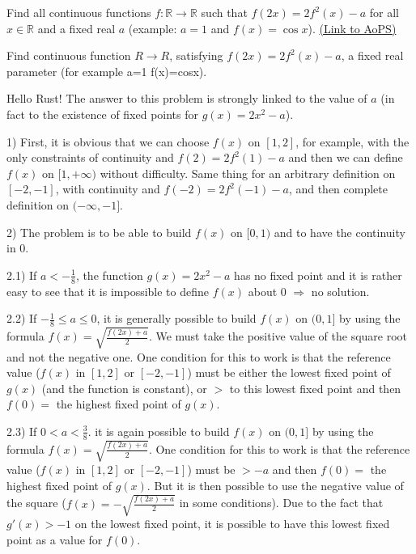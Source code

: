 \begin{problem}
	Find all continuous functions $f:\mathbb R\to \mathbb R$ such that $f(2x)=2f^{2}(x)-a$ for all $x \in \mathbb R$ and a fixed real $a$ (example: $a=1$ and $f(x)=\cos x$).
	\flushright \href{https://artofproblemsolving.com/community/c6h149457}{(Link to AoPS)}
\end{problem}



\begin{mysolution}
	\begin{tcolorbox}Find continuous function $R\to R$, satisfying $f(2x)=2f^{2}(x)-a$, a fixed real parameter (for example a=1 f(x)=cosx).\end{tcolorbox}

Hello Rust!
The answer to this problem is strongly linked to the value of $a$ (in fact to the existence of fixed points for $g(x)=2x^{2}-a$).

1) First, it is obvious that we can choose $f(x)$ on $[1,2]$, for example, with the only constraints of continuity and $f(2)=2f^{2}(1)-a$ and then we can define $f(x)$ on $[1,+\infty)$ without difficulty. Same thing for an arbitrary definition on $[-2,-1]$, with continuity and $f(-2)=2f^{2}(-1)-a$, and then complete definition on $(-\infty,-1]$.

2) The problem is to be able to build $f(x)$ on $[0,1)$ and to have the continuity in $0$.

2.1) If $a<-\frac{1}{8}$, the function $g(x)=2x^{2}-a$ has no fixed point and it is rather easy to see that it is impossible to define $f(x)$ about $0$ $\Rightarrow $ no solution.

2.2) If $-\frac{1}{8}\leq a\leq 0$, it is generally possible to build $f(x)$ on $(0,1]$ by using the formula $f(x)=\sqrt{\frac{f(2x)+a}{2}}$.  We must take the positive value of the square root and not the negative one.
One condition for this to work is that the reference value ($f(x)$ in $[1,2]$ or $[-2,-1]$) must be either the lowest fixed point of $g(x)$ (and the function is constant), or $>$ to this lowest fixed point and then $f(0)=$ the highest fixed point of $g(x)$.

2.3) If $0<a<\frac{3}{8}$. it is again possible to build $f(x)$ on $(0,1]$ by using the formula $f(x)=\sqrt{\frac{f(2x)+a}{2}}$.  One condition for this to work is that the reference value ($f(x)$ in $[1,2]$ or $[-2,-1]$) must be $>-a$ and then $f(0)=$ the highest fixed point of $g(x)$.
But it is then possible to use the negative value of the square ($f(x)=-\sqrt{\frac{f(2x)+a}{2}}$ in some conditions). Due to the fact that $g'(x)>-1$ on the lowest fixed point, it is possible to have this lowest fixed point as a value for $f(0)$.


\end{mysolution}
